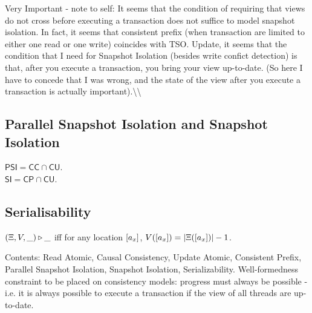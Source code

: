 \ac{Very Important - note to self: It seems that the condition of 
requiring that views do not cross before executing a transaction 
does not suffice to model snapshot isolation. In fact, it seems that 
consistent prefix (when transaction are limited to either one read 
or one write) coincides with TSO.
Update, it seems that the condition that I need for Snapshot Isolation 
(besides write confict detection) is that, after you execute a transaction, 
you bring your view up-to-date. (So here I have to concede that I was wrong, 
and the state of the view after you execute a transaction is actually important).\\

}


\subsection{Parallel Snapshot Isolation and Snapshot Isolation}
\begin{definition}
$\mathsf{PSI} = \mathsf{CC} \cap \mathsf{CU}$. \\
$\mathsf{SI} = \mathsf{CP} \cap \mathsf{CU}$.
\end{definition}

\subsection{Serialisability}

\begin{definition}
$(\Xi, V,  \_) \triangleright \_$ iff for any location $[a_x]$, 
$V([a_x]) = \lvert \Xi([a_x]) \rvert -1$. 
\end{definition}

\ac{Contents: Read Atomic, Causal Consistency, Update Atomic, Consistent Prefix, Parallel Snapshot Isolation, Snapshot Isolation, 
Serializability. Well-formedness constraint to be placed on consistency models: progress must always be possible - i.e. it is 
always possible to execute a transaction if the view of all threads are up-to-date.}  